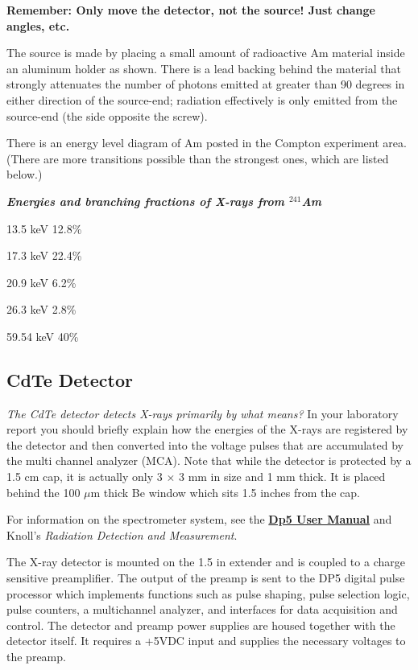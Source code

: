 \documentclass{../lab}
\begin{document}
\textbf{Remember: Only move the detector, not the source! Just change angles, etc.}

The source is made by placing a small amount of radioactive Am material inside an aluminum holder as shown. There is a lead backing behind the material that strongly attenuates the number of photons emitted at greater than 90 degrees in either direction of the source-end; radiation effectively is only emitted from the source-end (the side opposite the screw).

There is an energy level diagram of Am posted in the Compton experiment area. (There are more transitions possible than the strongest ones, which are listed below.)

\textbf{\emph{Energies and branching fractions of X-rays from $^{241}$Am}}

13.5 keV 12.8\%

17.3 keV 22.4\%

20.9 keV 6.2\%

26.3 keV 2.8\%

59.54 keV 40\%

\subsection{CdTe Detector}

\emph{The CdTe detector detects X-rays primarily by what means?} In your laboratory report you should briefly explain how the energies of the X-rays are registered by the detector and then converted into the voltage pulses that are accumulated by the multi channel analyzer (MCA). Note that while the detector is protected by a 1.5 cm cap, it is actually only 3 $\times$ 3 mm in size and 1 mm thick. It is placed behind the 100 $\mu$m thick Be window which sits 1.5 inches from the cap.

For information on the spectrometer system, see the \href{https://drive.google.com/file/d/1S_hXXRL4GW977xO7LOYe3EZb3q0KI78N/view?usp=drive_link}{\textbf{Dp5 User Manual}} and Knoll's \emph{Radiation Detection and Measurement}.

The X-ray detector is mounted on the 1.5 in extender and is coupled to a charge sensitive preamplifier. The output of the preamp is sent to the DP5 digital pulse processor which implements functions such as pulse shaping, pulse selection logic, pulse counters, a multichannel analyzer, and interfaces for data acquisition and control. The detector and preamp power supplies are housed together with the detector itself. It requires a +5VDC input and supplies the necessary voltages to the preamp.
\end{document}
